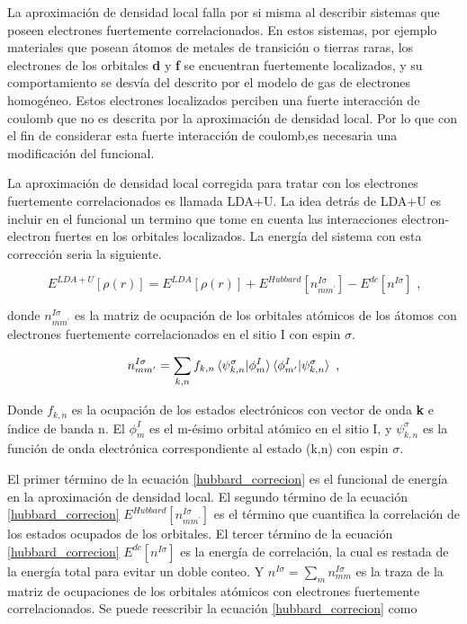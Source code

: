 La aproximaci\'on de densidad local falla por si misma al describir sistemas 
que poseen electrones fuertemente correlacionados. En estos sistemas, por 
ejemplo materiales que posean \'atomos de metales de transici\'on o tierras 
raras, los electrones de los orbitales \textbf{d} y \textbf{f} se encuentran 
fuertemente localizados, y su comportamiento se desv\'ia del descrito por el 
modelo de gas de electrones homog\'eneo. Estos electrones localizados perciben 
una fuerte interacci\'on de coulomb que no es descrita por la aproximaci\'on de 
densidad local. Por lo que con el fin de considerar esta fuerte interacci\'on 
de 
coulomb,es necesaria una modificaci\'on del funcional.

\noindent La aproximaci\'on de densidad local corregida para tratar con los 
electrones 
fuertemente correlacionados es llamada LDA+U. La idea detr\'as de LDA+U es 
incluir en el funcional un termino que tome en cuenta las interacciones 
electron-electron fuertes en los orbitales localizados. La energ\'ia del 
sistema con esta correcci\'on seria la siguiente.

\begin{equation}\label{hubbard_correcion}
E^{LDA+U} [\rho (r)]= E^{LDA} [\rho (r)] + 
E^{Hubbard}[n_{mm^{\prime}}^{I\sigma}] - E^{dc}[n^{I\sigma}] \textrm{ ,}
\end{equation}

\noindent donde $n_{mm^{\prime}}^{I\sigma}$ es la matriz de ocupaci\'on de los 
orbitales 
at\'omicos de los \'atomos con electrones fuertemente correlacionados en el 
sitio I con espin $\sigma$.

\begin{equation}
n_{mm^{\prime}}^{I\sigma} = \sum _{k,n} f_{k,n} \braket{\psi _{k,n}^{\sigma } | 
\phi _{m}^{I}} \braket{\phi _{m^{\prime}}^{I} | \psi _{k,n}^{\sigma }} \textrm{ 
,}
\end{equation}

\noindent Donde $f_{k,n}$ es la ocupaci\'on de los estados electr\'onicos con 
vector de 
onda \textbf{k} e \'indice de banda n. El $\phi _{m}^{I}$ es el m-\'esimo 
orbital 
at\'omico en el sitio I, y $\psi _{k,n}^{\sigma }$ es la funci\'on  de onda 
electr\'onica correspondiente al estado (k,n) con espin $\sigma $.



\noindent El primer t\'ermino de la ecuaci\'on \ref{hubbard_correcion} es el 
funcional de 
energ\'ia en la aproximaci\'on de densidad local. El segundo t\'ermino de la 
ecuaci\'on \ref{hubbard_correcion} $E^{Hubbard}[n_{mm^{\prime}}^{I\sigma}]$ es 
el t\'ermino que cuantifica la correlaci\'on de los estados ocupados de los 
orbitales. El tercer t\'ermino de la ecuaci\'on \ref{hubbard_correcion} 
$E^{dc}[n^{I\sigma}]$ es la energ\'ia de correlaci\'on, la cual es restada de 
la energ\'ia total para evitar un doble conteo. Y $n^{I\sigma} = \sum _{m} 
n_{mm}^{I\sigma}$ es la traza de la matriz de ocupaciones de los orbitales 
at\'omicos con electrones fuertemente correlacionados. Se puede reescribir la 
ecuaci\'on \ref{hubbard_correcion} como

